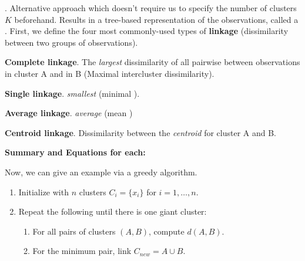\documentclass[12pt]{article}
\newcommand{\myspace}{\vspace{2\bigskipamount}}
\newcommand\p{\Needspace{10\baselineskip} \noindent}
\begin{document}
\myspace
\p {}. Alternative approach which doesn't require us to specify the number of clusters $K$ beforehand. Results in a tree-based representation of the observations, called a . First, we define the four most commonly-used types of \textbf{linkage} (dissimilarity between two groups of observations). 
\begin{compactitem}
	\item \textbf{Complete linkage}. The \textit{largest} dissimilarity of all pairwise between observations in cluster A and in B (Maximal intercluster dissimilarity). 
	\item \textbf{Single linkage}. \textellipsis \textit{smallest} \textellipsis\textellipsis (minimal \textellipsis). 
	\item \textbf{Average linkage}. \textellipsis \textit{average} \textellipsis\textellipsis (mean \textellipsis)
	\item \textbf{Centroid linkage}. Dissimilarity between the \textit{centroid} for cluster A and B. 
	\item \textbf{Summary and Equations for each:}
\end{compactitem}
Now, we can give an example via a greedy algorithm.
\begin{enumerate}
	\item Initialize with $n$ clusters $C_i = \{x_i\}$ for $i = 1, \ldots, n$. 
	
	\item Repeat the following until there is one giant cluster:
	\begin{enumerate}
		\item For all pairs of clusters $(A, B)$, compute $d(A, B)$. 
		
		\item For the minimum pair, link $C_{new} = A \cup B$. 
	\end{enumerate}
\end{enumerate}
\end{document}
